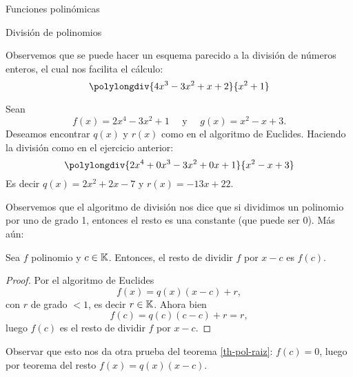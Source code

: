 \begin{chapter}{Funciones polin\'omicas}
\begin{section}{Divisi\'on de polinomios}
\begin{ejemplo*}
        Observemos que se puede hacer un esquema parecido a  la división de números enteros, el cual nos facilita el cálculo:
        \begin{equation*}
            \polylongdiv{4x^3 - 3x^2 + x + 2}{ x^2 + 1}
        \end{equation*}
    \end{ejemplo*}
    
    \begin{ejemplo*}
        Sean
        \begin{equation*}
            f (x) = 2x^4 - 3x^2 + 1 \quad \text{ y } \quad g (x) = x^2 - x + 3.
        \end{equation*}
        Deseamos encontrar $q (x)$ y $r (x)$ como en el algoritmo de Euclides. Haciendo la división como en el ejercicio anterior:
        \begin{equation*}
        \polylongdiv{2x^4 +0x^3- 3x^2 +0x+ 1}{x^2 - x + 3}
        \end{equation*}
        Es decir $q(x) = 2x^2+2x-7$ y $r(x)= -13x+22$.
    \end{ejemplo*}
    
    Observemos que el algoritmo de división nos dice que si dividimos un polinomio por uno de grado 1,  entonces el resto es una constante (que puede ser 0). Más aún:
    
    \begin{teorema} Sea $f$ polinomio y $c \in \mathbb K$. Entonces,  el resto de dividir $f$ por $x-c$ es $f(c)$. 
    \end{teorema}
    \begin{proof} Por  el algoritmo de Euclides
        \begin{equation*}
            f(x) = q(x)(x-c) + r,
        \end{equation*}
        con $r$ de grado $<1$,  es decir $r \in \mathbb K$.  Ahora bien
        \begin{equation*}
        f(c) = q(c)(c-c) + r = r,
        \end{equation*}
        luego $f(c)$  es el resto de dividir $f$ por $x-c$. 
    \end{proof}
    
    Observar que esto  nos da otra prueba del teorema \ref{th-pol-raiz}: $f(c)=0$, luego por teorema del resto $ f(x)=q(x)(x-c)$. 
            
        \end{section}	
        \end{chapter}	

